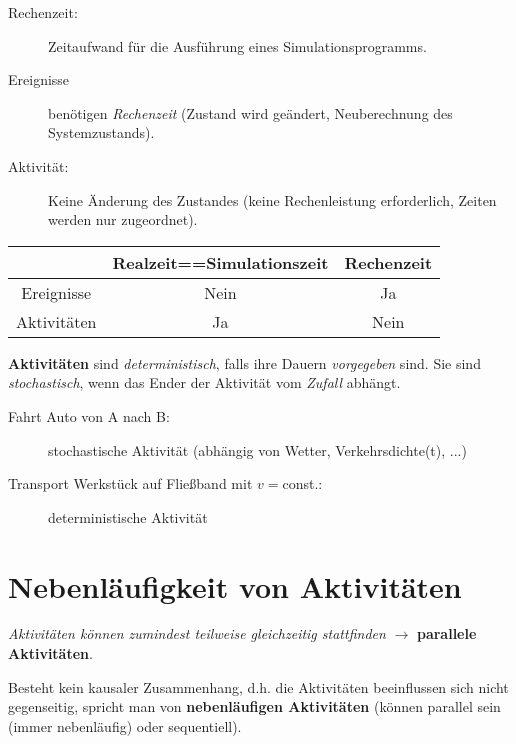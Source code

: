 \documentclass[11pt, a4paper]{article}
\begin{document}
\begin{figure}[H]
\centering
{}
\end{figure}

\begin{description}
\item[Rechenzeit:] Zeitaufwand für die Ausführung eines Simulationsprogramms.
  \item[Ereignisse] benötigen \emph{Rechenzeit} (Zustand wird geändert, Neuberechnung des Systemzustands).
  \item[Aktivität:] Keine Änderung des Zustandes (keine Rechenleistung erforderlich, Zeiten werden nur zugeordnet).
\end{description}

\begin{table}[H]
  \centering
  \begin{tabular}{c|c|c}
    & Realzeit==Simulationszeit & Rechenzeit\\
    \hline
    Ereignisse & Nein & Ja\\
    Aktivitäten & Ja & Nein
  \end{tabular}
\end{table}

\textbf{Aktivitäten} sind \emph{deterministisch}, falls ihre Dauern \emph{vorgegeben} sind. Sie sind \emph{stochastisch}, wenn das Ender der Aktivität vom \emph{Zufall} abhängt.

\begin{description}
  \item[Fahrt Auto von A nach B:] stochastische Aktivität
        (abhängig von Wetter, Verkehrsdichte(t), ...)
\end{description}

\begin{description}
  \item[Transport Werkstück auf Fließband mit $v=$const.:] deterministische Aktivität
\end{description}

\section{Nebenläufigkeit von Aktivitäten}
\emph{Aktivitäten können zumindest teilweise gleichzeitig stattfinden} $\rightarrow$ \textbf{parallele Aktivitäten}.

Besteht kein kausaler Zusammenhang, d.h. die Aktivitäten beeinflussen sich nicht gegenseitig, spricht man von \textbf{nebenläufigen Aktivitäten} (können parallel sein (immer nebenläufig) oder sequentiell).
\end{document}

